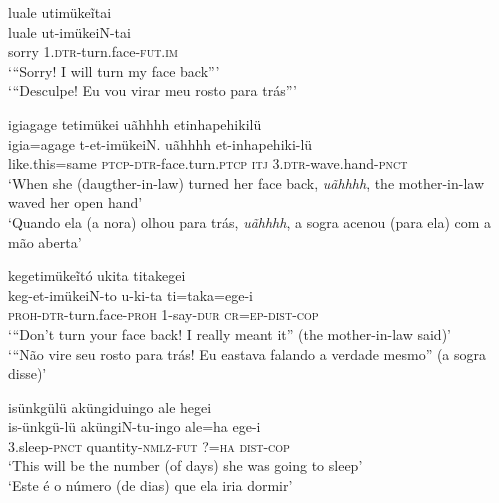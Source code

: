 \documentclass[output=paper,
modfonts,nonflat
]{langsci/langscibook}
\begin{document}
 
\ea luale utimükeĩtai \\[.3em]
\gll luale ut-imükeiN-tai \\
sorry \textsc{1.dtr}-turn.face-\textsc{fut.im} \\
\glt ‘“Sorry! I will turn my face back”’ \\
‘“Desculpe! Eu vou virar meu rosto para trás”’ \\
\z 

\ea igiagage tetimükei uãhhhh     etinhapehikilü{\footnotemark}{} \\[.3em]
\gll igia=agage t-et-imükeiN. uãhhhh     et-inhapehiki-lü \\
like.this=same \textsc{ptcp-dtr}-face.turn.\textsc{ptcp} \textsc{itj} 3.\textsc{dtr}-wave.hand-\textsc{pnct} \\ 
\glt ‘When she (daugther-in-law) turned her face back, \textit{uãhhhh}, the mother-in-law waved her open hand’ \\
‘Quando ela (a nora) olhou para trás, \textit{uãhhhh}, a sogra acenou (para ela) com a mão aberta’ \\
\z

\ea kegetimükeĩtó ukita titakegei \\[.3em]
\gll keg-et-imükeiN-to u-ki-ta ti=taka=ege-i \\
\textsc{proh-dtr}-turn.face-\textsc{proh} 1-say-\textsc{dur} \textsc{cr=ep-dist-cop} \\
\glt ‘“Don’t turn your face back! I really meant it” (the mother-in-law said)’ \\
‘“Não vire seu rosto para trás! Eu eastava falando a verdade mesmo” (a sogra disse)’ \\
\z

\newpage 
\ea isünkgülü aküngiduingo ale hegei{\footnotemark}{} \\[.3em]
\gll is-ünkgü-lü aküngiN-tu-ingo ale=ha ege-i \\
3.sleep-\textsc{pnct} quantity-\textsc{nmlz-fut} ?=\textsc{ha} \textsc{dist-cop} \\
 \glt ‘This will be the number (of days) she was going to sleep’  \\
‘Este é o número (de dias) que ela iria dormir’ \\
\z
\end{document}
